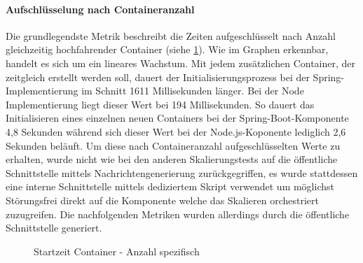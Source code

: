 \paragraph{Aufschlüsselung nach Containeranzahl}
\label{par:specContainer}
Die grundlegendste Metrik beschreibt die Zeiten aufgeschlüsselt nach Anzahl gleichzeitig hochfahrender Container (siehe \ref{fig:specContainers}). Wie im Graphen erkennbar, handelt es sich um ein lineares Wachstum. Mit jedem zusätzlichen Container, der zeitgleich erstellt werden soll, dauert der Initialisierungsprozess bei der Spring-Implementierung im Schnitt 1611 Millisekunden länger. Bei der Node Implementierung liegt dieser Wert bei 194 Millisekunden. So dauert das Initialisieren eines einzelnen neuen Containers bei der Spring-Boot-Komponente 4,8 Sekunden während sich dieser Wert bei der Node.js-Koponente lediglich 2,6 Sekunden beläuft. Um diese nach Containeranzahl aufgeschlüsselten Werte zu erhalten, wurde nicht wie bei den anderen Skalierungstests auf die öffentliche Schnittstelle mittels Nachrichtengenerierung zurückgegriffen, es wurde stattdessen eine interne Schnittstelle mittels dediziertem Skript verwendet um möglichst Störungsfrei direkt auf die Komponente welche das Skalieren orchestriert zuzugreifen. Die nachfolgenden Metriken wurden allerdings durch die öffentliche Schnittstelle generiert.

\begin{figure}
  \centering
  \caption[Startzeit Container - Anzahl spezifisch]{Startzeit Container - Anzahl spezifisch}
  \label{fig:specContainers}
\end{figure}

